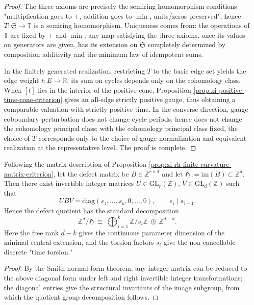 \begin{proof}
The three axioms are precisely the semiring homomorphism conditions "multiplication goes to \(+\), addition goes to \(\min\), units/zeros preserved"; hence \(T:\mathfrak S\to\mathbb T\) is a semiring homomorphism.
Uniqueness comes from: the operations of \(\mathbb T\) are fixed by \(+\) and \(\min\); any map satisfying the three axioms, once its values on generators are given, has its extension on \(\mathfrak S\) completely determined by composition additivity and the minimum law of idempotent sums.
\par
In the finitely generated realization, restricting \(T\) to the basic edge set yields the edge weight \(t:E\to\mathbb R\); its sum on cycles depends only on the cohomology class.
When \([t]\) lies in the interior of the positive cone, Proposition \ref{prop:xi-positive-time-cone-criterion} gives an all-edge strictly positive gauge, thus obtaining a comparable valuation with strictly positive time.
In the converse direction, gauge coboundary perturbation does not change cycle periods, hence does not change the cohomology principal class; with the cohomology principal class fixed, the choice of \(T\) corresponds only to the choice of gauge normalization and equivalent realization at the representative level. The proof is complete.
\end{proof}

\begin{proposition}\label{prop:xi-time-defect-smith-reduction}
Following the matrix description of Proposition \ref{prop:xi-rh-finite-curvature-matrix-criterion}, let the defect matrix be \(B\in\mathbb Z^{r\times d}\) and let \(\mathfrak H:=\mathrm{im}(B)\subset\mathbb Z^d\).
Then there exist invertible integer matrices \(U\in\mathrm{GL}_r(\mathbb Z)\), \(V\in\mathrm{GL}_d(\mathbb Z)\) such that
\[
UBV=\mathrm{diag}(s_1,\dots,s_k,0,\dots,0),
\qquad
s_i\mid s_{i+1}.
\]
Hence the defect quotient has the standard decomposition
\[
\mathbb Z^d/\mathfrak H
\ \cong\
\bigoplus_{i=1}^k\mathbb Z/s_i\mathbb Z\ \oplus\ \mathbb Z^{d-k}.
\]
Here the free rank \(d-k\) gives the continuous parameter dimension of the minimal central extension, and the torsion factors \(s_i\) give the non-cancellable discrete "time torsion."
\end{proposition}

\begin{proof}
By the Smith normal form theorem, any integer matrix can be reduced to the above diagonal form under left and right invertible integer transformations; the diagonal entries give the structural invariants of the image subgroup, from which the quotient group decomposition follows.
\end{proof}

